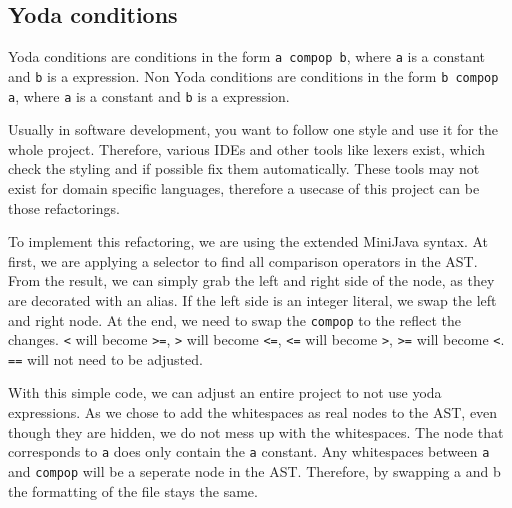 
\subsection{Yoda conditions}

Yoda conditions are conditions in the form \verb|a compop b|, where \verb|a| is a constant and \verb|b| is a expression.
Non Yoda conditions are conditions in the form \verb|b compop a|, where \verb|a| is a constant and \verb|b| is a expression.

Usually in software development, you want to follow one style and use it for the whole project. Therefore, various IDEs and other tools like lexers exist, which check
the styling and if possible fix them automatically. These tools may not exist for domain specific languages, therefore a usecase of this project can be those refactorings.

To implement this refactoring, we are using the extended MiniJava syntax. At first, we are applying a selector to find all comparison operators in the AST.
From the result, we can simply grab the left and right side of the node, as they are decorated with an alias. If the left side is an integer literal, we swap the left and right node.
At the end, we need to swap the \verb|compop| to the reflect the changes. \verb|<| will become \verb|>=|, \verb|>| will become \verb|<=|, \verb|<=| will become \verb|>|, \verb|>=| will become \verb|<|.
\verb|==| will not need to be adjusted.

With this simple code, we can adjust an entire project to not use yoda expressions. As we chose to add the whitespaces as real nodes to the AST, even though they are hidden, we do not mess up with the whitespaces.
The node that corresponds to \verb|a| does only contain the \verb|a| constant. Any whitespaces between \verb|a| and \verb|compop| will be a seperate node in the AST. Therefore, by swapping a and b the formatting
of the file stays the same.